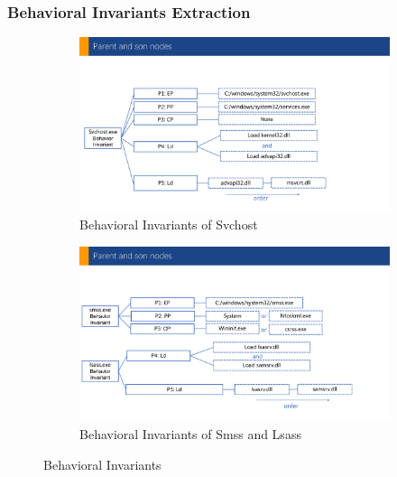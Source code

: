 \subsubsection{Behavioral Invariants Extraction}\label{sec:BIE}

\begin{figure}[h]
  \begin{subfigure}{.45\textwidth}
      \includegraphics[width=\textwidth]{figs/cons-svchost.pdf}
      \caption{Behavioral Invariants of Svchost}
      \label{fig:cons-svchost}
  \end{subfigure}
  \hfill
  \begin{subfigure}{.5\textwidth}
      \includegraphics[width=\textwidth]{figs/cons-smss-lsass.pdf}
      \caption{Behavioral Invariants of Smss and Lsass}
      \label{fig:cons-smss-lsass}
  \end{subfigure}
  \hfill
  \caption{Behavioral Invariants}
  \label{fig:cons-def}
 \end{figure}

